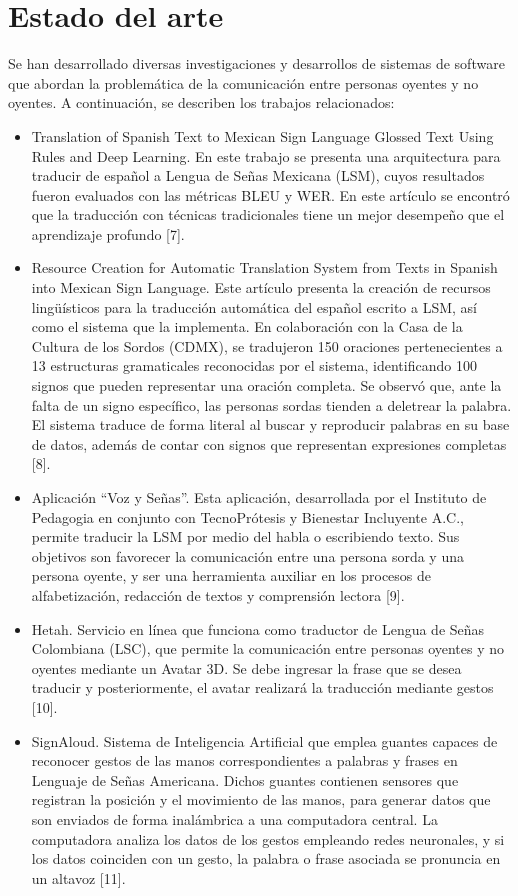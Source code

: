 \section{Estado del arte}
Se han desarrollado diversas investigaciones y desarrollos de sistemas de software que abordan la problemática de la comunicación entre personas oyentes y no oyentes. A continuación, se describen los trabajos relacionados: \begin{itemize}
    \item Translation of Spanish Text to Mexican Sign Language Glossed Text Using Rules and Deep Learning. En este trabajo se presenta una arquitectura para traducir de español a Lengua de Señas Mexicana (LSM), cuyos resultados fueron evaluados con las métricas BLEU y WER. En este artículo se encontró que la traducción con técnicas tradicionales tiene un mejor desempeño que el aprendizaje profundo [7].
\item Resource Creation for Automatic Translation System from Texts in Spanish into Mexican Sign Language. Este artículo presenta la creación de recursos lingüísticos para la traducción automática del español escrito a LSM, así como el sistema que la implementa. En colaboración con la Casa de la Cultura de los Sordos (CDMX), se tradujeron 150 oraciones pertenecientes a 13 estructuras gramaticales reconocidas por el sistema, identificando 100 signos que pueden representar una oración completa. Se observó que, ante la falta de un signo específico, las personas sordas tienden a deletrear la palabra. El sistema traduce de forma literal al buscar y reproducir palabras en su base de datos, además de contar con signos que representan expresiones completas [8].
\item Aplicación “Voz y Señas”. Esta aplicación, desarrollada por el Instituto de Pedagogia en conjunto con TecnoPrótesis y Bienestar Incluyente A.C., permite traducir la LSM por medio del habla o escribiendo texto. Sus objetivos son favorecer la comunicación entre una persona sorda y una persona oyente, y ser una herramienta auxiliar en los procesos de alfabetización, redacción de textos y comprensión lectora [9]. 
\item Hetah. Servicio en línea que funciona como traductor de Lengua de Señas Colombiana (LSC), que permite la comunicación entre personas oyentes y no oyentes mediante un Avatar 3D. Se debe ingresar la frase que se desea traducir y posteriormente, el avatar realizará la traducción mediante gestos [10]. 
\item SignAloud. Sistema de Inteligencia Artificial que emplea guantes capaces de reconocer gestos de las manos correspondientes a palabras y frases en Lenguaje de Señas Americana. Dichos guantes contienen sensores que registran la posición y el movimiento de las manos, para generar datos que son enviados de forma inalámbrica a una computadora central. La computadora analiza los datos de los gestos empleando redes neuronales, y si los datos coinciden con un gesto, la palabra o frase asociada se pronuncia en un altavoz [11].

\end{itemize}
